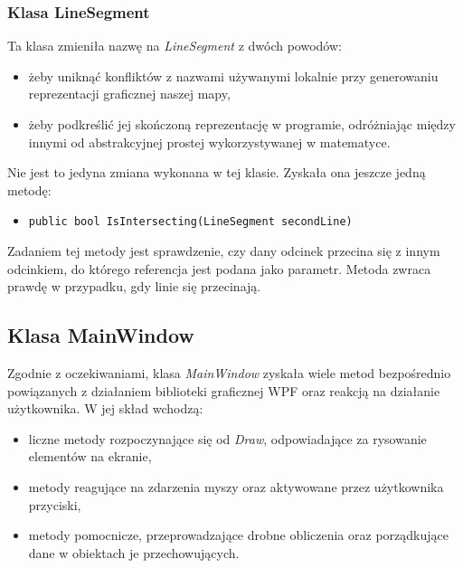\documentclass[a4paper,12pt]{article}
\newcommand\tab[1][0.6cm]{\hspace*{#1}}
\begin{document}
\subsubsection{Klasa LineSegment}

\tab Ta klasa zmieniła nazwę na \textit{LineSegment} z dwóch powodów: 

\begin{itemize}
\item żeby uniknąć konfliktów z nazwami używanymi lokalnie przy generowaniu reprezentacji graficznej naszej mapy,
\item żeby podkreślić jej skończoną reprezentację w programie, odróżniając między innymi od abstrakcyjnej prostej wykorzystywanej w matematyce.
\end{itemize}

Nie jest to jedyna zmiana wykonana w tej klasie. Zyskała ona jeszcze jedną metodę:

\begin{itemize}
\item \begin{lstlisting}
public bool IsIntersecting(LineSegment secondLine)
\end{lstlisting}
\end{itemize}

Zadaniem tej metody jest sprawdzenie, czy dany odcinek przecina się z innym odcinkiem, do którego referencja jest podana jako parametr. Metoda zwraca prawdę w przypadku, gdy linie się przecinają.

\subsection{Klasa MainWindow} 

\tab Zgodnie z oczekiwaniami, klasa \textit{MainWindow} zyskała wiele metod bezpośrednio powiązanych z działaniem biblioteki graficznej WPF oraz reakcją na działanie użytkownika. W jej skład wchodzą: 

\begin{itemize}
\item liczne metody rozpoczynające się od \textit{Draw}, odpowiadające za rysowanie elementów na ekranie,
\item metody reagujące na zdarzenia myszy oraz aktywowane przez użytkownika przyciski,
\item metody pomocnicze, przeprowadzające drobne obliczenia oraz porządkujące dane w obiektach je przechowujących.
\end{itemize}
\end{document}
